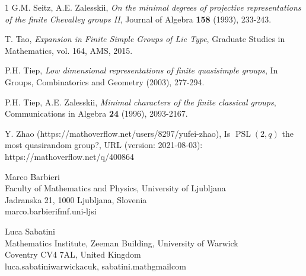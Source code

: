 \documentclass{daj}
\theoremstyle{definition}
\theoremstyle{remark}
\begin{document}
\begin{thebibliography}{1}
 G.M. Seitz, A.E. Zalesskii,
\textit{On the minimal degrees of projective representations of the finite Chevalley groups II},
Journal of Algebra \textbf{158} (1993), 233-243.

 T. Tao,
\textit{Expansion in Finite Simple Groups of Lie Type},
Graduate Studies in Mathematics, vol. 164, AMS, 2015.

 P.H. Tiep,
\textit{Low dimensional representations of finite quasisimple groups},
In Groups, Combinatorics and Geometry (2003), 277-294.

 P.H. Tiep, A.E. Zalesskii,
\textit{Minimal characters of the finite classical groups},
Communications in Algebra \textbf{24} (1996), 2093-2167.

 Y. Zhao
(https://mathoverflow.net/users/8297/yufei-zhao), Is $\operatorname{PSL}(2,q)$ the most quasirandom group?,
URL (version: 2021-08-03): https://mathoverflow.net/q/400864

   \end{thebibliography}



\begin{dajauthors}
\begin{authorinfo}[mb]
  Marco Barbieri\\
  Faculty of Mathematics and Physics, University of Ljubljana\\
  Jadranska 21, 1000 Ljubljana, Slovenia\\
  marco.barbieri\imageat{}fmf.uni-lj\imagedot{}si
\end{authorinfo}

\begin{authorinfo}[ls]
  Luca Sabatini\\
  Mathematics Institute, Zeeman Building, University of Warwick\\
  Coventry CV4 7AL, United Kingdom\\
  luca.sabatini\imageat{}warwick\imagedot{}ac\imagedot{}uk, sabatini.math\imageat{}gmail\imagedot{}com
\end{authorinfo}
\end{dajauthors}
\end{document}
